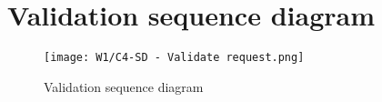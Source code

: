 \section{Validation sequence diagram}\label{appendix:validation-sequence-diagram}
\begin{figure}[hbt!]
  \centering
  \texttt{[image: W1/C4-SD - Validate request.png]}
  \caption{Validation sequence diagram}
  \label{fig:validation-sequence-diagram}
\end{figure}

\newpage
